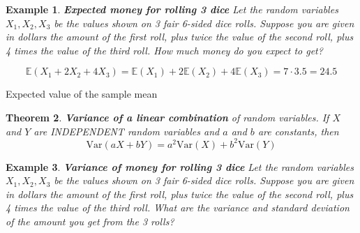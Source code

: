 \documentclass[12pt]{amsart}
\newtheorem{theorem}{Theorem}[section]
\newtheorem{example}[theorem]{Example}
\begin{document}
{%
\begin{example}  \textbf{Expected money for rolling 3 dice} \newline
Let the random variables $X_1, X_2, X_3$ be the values shown on 3 fair 6-sided dice rolls. \newline 
Suppose you are given in dollars the amount of the first roll, plus twice the value of the second roll, plus 4 times the value of the third roll. \newline 
How much money do you expect to get?  \newline 


\color{blue}
$$\mathbb{E}(X_1 + 2X_2 + 4X_3) = \mathbb{E}(X_1) + 2\mathbb{E}(X_2) + 4\mathbb{E}(X_3) = 7\cdot 3.5 = 24.5$$
\color{black}

\end{example} 

\vspace{2cm}

\color{blue}
Expected value of the sample mean
\color{black}


\newpage
\begin{theorem}{\textbf{Variance of a linear combination} of random variables.} \newline
If $X$ and $Y$ are INDEPENDENT random variables and $a$ and $b$ are constants, then 
\color{blue}
$$\text{Var}(aX + bY) = a^2 \text{Var}(X) + b^2\text{Var}(Y)$$
\color{black}
\vspace{.5cm}


\end{theorem}

\begin{example}  \textbf{Variance of money for rolling 3 dice} \newline
Let the random variables $X_1, X_2, X_3$ be the values shown on 3 fair 6-sided dice rolls. \newline 
Suppose you are given in dollars the amount of the first roll, plus twice the value of the second roll, plus 4 times the value of the third roll. \newline 
What are the variance and standard deviation of the amount you get from the 3 rolls?  \newline 



\end{example}}
\end{document}
